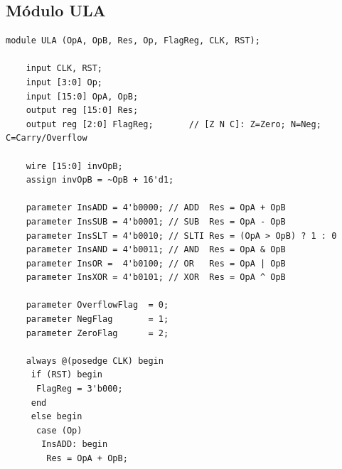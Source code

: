 \documentclass[11pt,a4paper,titlepage]{article}
\begin{document}
\begin{appendices}
	\chapter{Módulo ULA}
	\label{app:ULA}
	\begin{lstlisting}[style={verilog-style}]
module ULA (OpA, OpB, Res, Op, FlagReg, CLK, RST);

	input CLK, RST;
	input [3:0] Op;
	input [15:0] OpA, OpB;
	output reg [15:0] Res;
	output reg [2:0] FlagReg;		// [Z N C]: Z=Zero; N=Neg; C=Carry/Overflow
	
	wire [15:0] invOpB;
	assign invOpB = ~OpB + 16'd1;

	parameter InsADD = 4'b0000;	// ADD	Res = OpA + OpB
	parameter InsSUB = 4'b0001;	// SUB	Res = OpA - OpB
	parameter InsSLT = 4'b0010;	// SLTI	Res = (OpA > OpB) ? 1 : 0
	parameter InsAND = 4'b0011;	// AND 	Res = OpA & OpB
	parameter InsOR =  4'b0100;	// OR 	Res = OpA | OpB
	parameter InsXOR = 4'b0101;	// XOR 	Res = OpA ^ OpB
	
	parameter OverflowFlag	= 0;
	parameter NegFlag 		= 1;
	parameter ZeroFlag		= 2;
	
	always @(posedge CLK) begin
	 if (RST) begin
	  FlagReg = 3'b000;
	 end
	 else begin
	  case (Op)
	   InsADD: begin			
	    Res = OpA + OpB;
					

\end{lstlisting}
\end{appendices}
\end{document}
